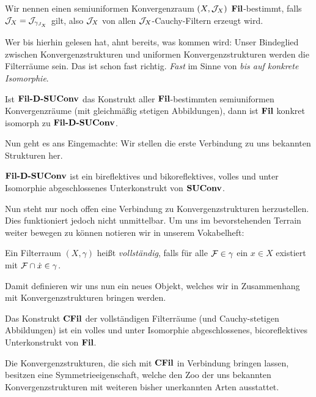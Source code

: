 \begin{defn}
  Wir nennen einen semiuniformen Konvergenzraum $(X, \mathcal{J}_X)$ $\mathbf{Fil}$-bestimmt, falls $\mathcal{J}_X = \mathcal{J}_{\gamma_{J_X}}$ gilt, also $\mathcal{J}_X$ von allen $\mathcal{J}_X$-Cauchy-Filtern erzeugt wird.
\end{defn}

Wer bis hierhin gelesen hat, ahnt bereits, was kommen wird: Unser Bindeglied zwischen Konvergenzstrukturen und uniformen Konvergenzstrukturen werden die Filterräume sein. Das ist schon fast richtig. \emph{Fast} im Sinne von \emph{bis auf konkrete Isomorphie}.


\begin{prop}
  Ist $\mathbf{Fil\textbf{-}D\textbf{-}SUConv}$ das Konstrukt aller $\mathbf{Fil}$-bestimmten semiuniformen Konvergenzräume (mit gleichmäßig stetigen Abbildungen), dann ist $\mathbf{Fil}$ konkret isomorph zu $\mathbf{Fil\textbf{-}D\textbf{-}SUConv}$.
\end{prop}

Nun geht es ans Eingemachte: Wir stellen die erste Verbindung zu uns bekannten Strukturen her.

\begin{prop}
  $\mathbf{Fil\textbf{-}D\textbf{-}SUConv}$ ist ein bireflektives und bikoreflektives, volles und unter Isomorphie abgeschlossenes Unterkonstrukt von $\mathbf{SUConv}$.
\end{prop}

Nun steht nur noch offen eine Verbindung zu Konvergenzstrukturen herzustellen.
Dies funktioniert jedoch nicht unmittelbar. 
Um uns im bevorstehenden Terrain weiter bewegen zu können notieren wir in unserem Vokabelheft:

\begin{defn}
  Ein Filterraum $(X, \gamma)$ heißt \emph{vollständig}, falls für alle $\mathcal{F} \in \gamma$ ein $x \in X$ existiert mit $\mathcal{F} \cap \dot x \in \gamma$.
\end{defn}

Damit definieren wir uns nun ein neues Objekt, welches wir in Zusammenhang mit Konvergenzstrukturen bringen werden.

\begin{prop}
  Das Konstrukt $\mathbf{CFil}$ der vollständigen Filterräume (und Cauchy-stetigen Abbildungen) ist ein volles und unter Isomorphie abgeschlossenes, bicoreflektives Unterkonstrukt von $\mathbf{Fil}$.
\end{prop}

Die Konvergenzstrukturen, die sich mit $\mathbf{CFil}$ in Verbindung bringen lassen, besitzen eine Symmetrieeigenschaft, welche den Zoo der uns bekannten Konvergenzstrukturen mit weiteren bisher unerkannten Arten ausstattet.

